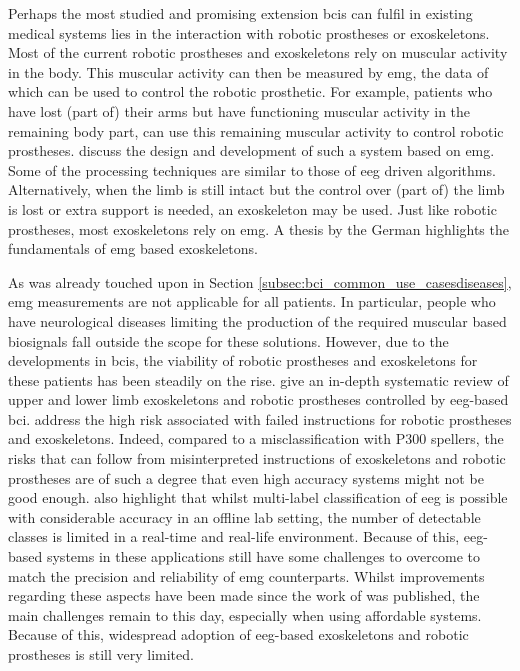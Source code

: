 
Perhaps the most studied and promising extension \glspl{bci} can fulfil in existing medical systems lies in the interaction with robotic prostheses or exoskeletons.
Most of the current robotic prostheses and exoskeletons rely on muscular activity in the body.
This muscular activity can then be measured by \gls{emg}, the data of which can be used to control the robotic prosthetic.
For example, patients who have lost (part of) their arms but have functioning muscular activity in the remaining body part, can use this remaining muscular activity to control robotic prostheses.
 discuss the design and development of such a system based on \gls{emg}.
Some of the processing techniques are similar to those of \gls{eeg} driven algorithms.
Alternatively, when the limb is still intact but the control over (part of) the limb is lost or extra support is needed, an exoskeleton may be used.
Just like robotic prostheses, most exoskeletons rely on \gls{emg}.
A thesis by the German \citet{emg_exoskeleton} highlights the fundamentals of \gls{emg} based exoskeletons.

As was already touched upon in Section \ref{subsec:bci_common_use_casesdiseases}, \gls{emg} measurements are not applicable for all patients.
In particular, people who have neurological diseases limiting the production of the required muscular based \glspl{biosignal} fall outside the scope for these solutions.
However, due to the developments in \glspl{bci}, the viability of robotic prostheses and exoskeletons for these patients has been steadily on the rise.
 give an in-depth systematic review of upper and lower limb exoskeletons and robotic prostheses controlled by \gls{eeg}-based \gls{bci}.
 address the high risk associated with failed instructions for robotic prostheses and exoskeletons.
Indeed, compared to a misclassification with P300 spellers, the risks that can follow from misinterpreted instructions of exoskeletons and robotic prostheses are of such a degree that even high accuracy systems might not be good enough.
 also highlight that whilst multi-label classification of \gls{eeg} is possible with considerable accuracy in an offline lab setting, the number of detectable classes is limited in a real-time and real-life environment.
Because of this, \gls{eeg}-based systems in these applications still have some challenges to overcome to match the precision and reliability of \gls{emg} counterparts.
Whilst improvements regarding these aspects have been made since the work of \citet{bci_prostheses} was published, the main challenges remain to this day, especially when using affordable systems.
Because of this, widespread adoption of \gls{eeg}-based exoskeletons and robotic prostheses is still very limited.

